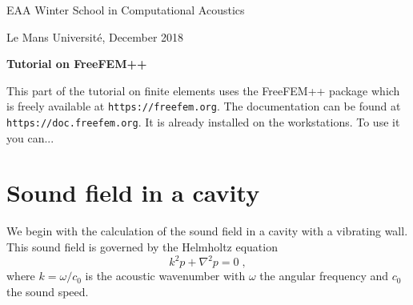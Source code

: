 \documentclass[english,3p]{elsarticle}
\begin{document}
\begin{center}
EAA Winter School in Computational Acoustics

Le Mans Université, December 2018
\vspace{5mm}

\textbf{\large Tutorial on FreeFEM++}
\end{center}

\vspace{10mm}

This part of the tutorial on finite elements uses the FreeFEM++ package which is freely available at \texttt{https://freefem.org}.
The documentation can be found at \texttt{https://doc.freefem.org}.
It is already installed on the workstations.
To use it you can...

\section{Sound field in a cavity}

We begin with the calculation of the sound field in a cavity with a vibrating wall.
This sound field is governed by the Helmholtz equation
\begin{equation}
k^2p + \nabla^2 p = 0
\;,
\label{eq:helmholtz}
\end{equation}
where $k=\omega/c_0$ is the acoustic wavenumber with $\omega$ the angular frequency and $c_0$ the sound speed.
\end{document}
